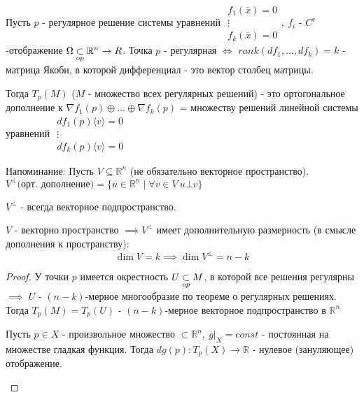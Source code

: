 \begin{theorem}
    \par
    Пусть $p$ - регулярное решение системы уравнений $\begin{array}{c} f_1(\overline{x}) = 0 \\ \vdots \\ f_k(\overline{x}) = 0 \end{array}, \ f_i$ - $C^r$-отображение $\Omega \underset{op}{\subset} \mathbb{R}^n \to R$.
    Точка $p$ - регулярная $\iff$ $rank(df_1, \hdots, df_k) = k$ - матрица Якоби, в которой дифференциал - это вектор столбец матрицы.
    \par
    Тогда $T_p(M)$ ($M$ - множество всех регулярных решений) - это ортогональное дополнение к $\nabla f_1(p) \oplus \hdots \oplus \nabla f_k(p)$ = множеству решений линейной системы уравнений $\begin{array}{c} df_1(p)\langle v \rangle = 0 \\ \vdots \\ df_k(p)\langle v \rangle = 0
    \end{array}$
    
    Напоминание:
    Пусть $V \subseteq \mathbb{R}^n$ (не обязательно векторное пространство). $V^{\bot} \text{(орт. дополнение)} = \{ u \in \mathbb{R}^n \mid \forall v \in V \ u \bot v \}$
    
    \begin{statement*}
        $V^{\bot}$ - всегда векторное подпространство.
    \end{statement*}
    
    \begin{statement*}
        $V$ - векторно пространство $\implies V^{\bot}$ имеет дополнительную размерность (в смысле дополнения к пространству):
        \[\dim V = k \implies \dim V^{\bot} = n - k\]
    \end{statement*}

    \begin{proof}
        У точки $p$ имеется окрестность $U \underset{op}{\subset} M$, в которой все решения регулярны $\implies$ $U$ - $(n-k)$-мерное многообразие по теореме о регулярных решениях. Тогда $T_p(M) = T_p(U)$ - $(n-k)$-мерное векторное подпространство в $\mathbb{R}^n$
        \par

        \begin{lemma*}
            Пусть $p \in X$ - произвольное множество $\subset \mathbb{R}^n, \ g|_X = const$ - постоянная на множестве гладкая функция. Тогда $dg(p):T_p(X) \to \mathbb{R}$ - нулевое (зануляющее) отображение.


\end{lemma*}
\end{proof}
\end{theorem}
